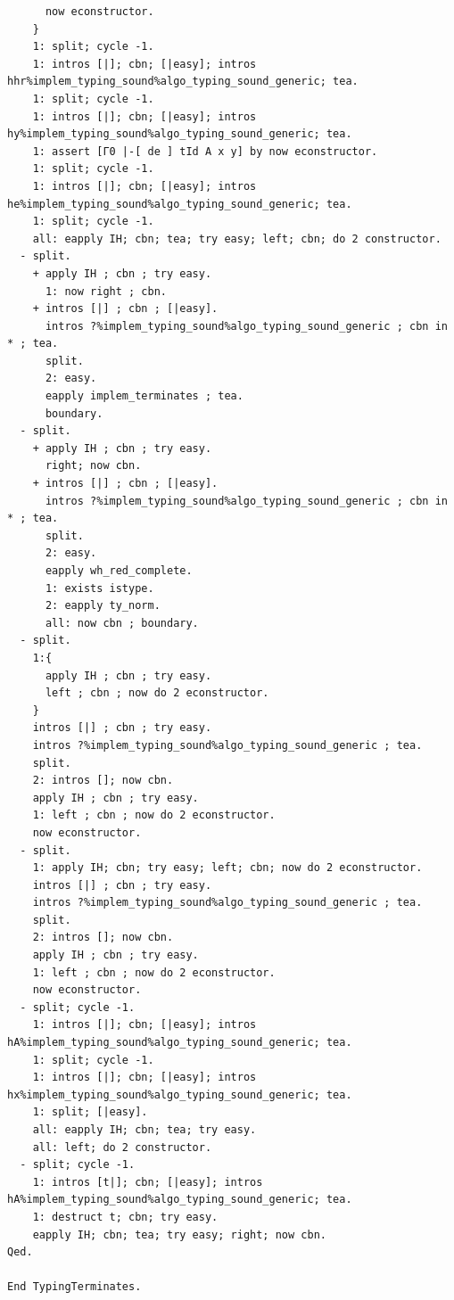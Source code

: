 \begin{lstlisting}
      now econstructor.
    }
    1: split; cycle -1.
    1: intros [|]; cbn; [|easy]; intros hhr%implem_typing_sound%algo_typing_sound_generic; tea.
    1: split; cycle -1.
    1: intros [|]; cbn; [|easy]; intros hy%implem_typing_sound%algo_typing_sound_generic; tea.
    1: assert [Γ0 |-[ de ] tId A x y] by now econstructor.
    1: split; cycle -1.
    1: intros [|]; cbn; [|easy]; intros he%implem_typing_sound%algo_typing_sound_generic; tea.
    1: split; cycle -1.
    all: eapply IH; cbn; tea; try easy; left; cbn; do 2 constructor.
  - split.
    + apply IH ; cbn ; try easy.
      1: now right ; cbn.
    + intros [|] ; cbn ; [|easy].
      intros ?%implem_typing_sound%algo_typing_sound_generic ; cbn in * ; tea.
      split.
      2: easy.
      eapply implem_terminates ; tea.
      boundary.
  - split.
    + apply IH ; cbn ; try easy.
      right; now cbn.
    + intros [|] ; cbn ; [|easy].
      intros ?%implem_typing_sound%algo_typing_sound_generic ; cbn in * ; tea.
      split.
      2: easy.
      eapply wh_red_complete.
      1: exists istype.
      2: eapply ty_norm.
      all: now cbn ; boundary.
  - split.
    1:{
      apply IH ; cbn ; try easy.
      left ; cbn ; now do 2 econstructor.
    }
    intros [|] ; cbn ; try easy.
    intros ?%implem_typing_sound%algo_typing_sound_generic ; tea.
    split.
    2: intros []; now cbn.
    apply IH ; cbn ; try easy.
    1: left ; cbn ; now do 2 econstructor.
    now econstructor.
  - split.
    1: apply IH; cbn; try easy; left; cbn; now do 2 econstructor.
    intros [|] ; cbn ; try easy.
    intros ?%implem_typing_sound%algo_typing_sound_generic ; tea.
    split.
    2: intros []; now cbn.
    apply IH ; cbn ; try easy.
    1: left ; cbn ; now do 2 econstructor.
    now econstructor.
  - split; cycle -1.
    1: intros [|]; cbn; [|easy]; intros hA%implem_typing_sound%algo_typing_sound_generic; tea.
    1: split; cycle -1.
    1: intros [|]; cbn; [|easy]; intros hx%implem_typing_sound%algo_typing_sound_generic; tea.
    1: split; [|easy].
    all: eapply IH; cbn; tea; try easy.
    all: left; do 2 constructor.
  - split; cycle -1.
    1: intros [t|]; cbn; [|easy]; intros hA%implem_typing_sound%algo_typing_sound_generic; tea.
    1: destruct t; cbn; try easy.
    eapply IH; cbn; tea; try easy; right; now cbn.
Qed.

End TypingTerminates.
\end{lstlisting}

